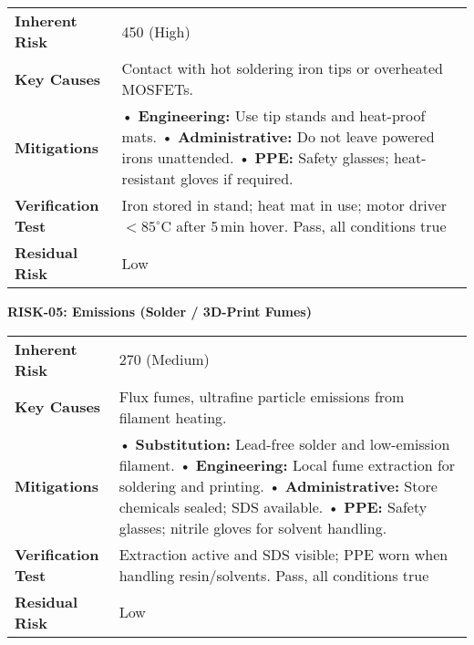 \begin{tabular}{@{}p{3cm}p{13cm}@{}}
\toprule
\textbf{Inherent Risk} & 450 (High) \\
\textbf{Key Causes} & Contact with hot soldering iron tips or overheated MOSFETs. \\
\textbf{Mitigations} &
• \textbf{Engineering:} Use tip stands and heat-proof mats. \newline
• \textbf{Administrative:} Do not leave powered irons unattended. \newline
• \textbf{PPE:} Safety glasses; heat-resistant gloves if required. \\
\textbf{Verification Test} & Iron stored in stand; heat mat in use; motor driver $<85^\circ$C after 5\,min hover. Pass, all conditions true \\
\textbf{Residual Risk} & Low \\
\bottomrule
\end{tabular}
\vspace{0.6em}

\textbf{RISK-05: Emissions (Solder / 3D-Print Fumes)}

\begin{tabular}{@{}p{3cm}p{13cm}@{}}
\toprule
\textbf{Inherent Risk} & 270 (Medium) \\
\textbf{Key Causes} & Flux fumes, ultrafine particle emissions from filament heating. \\
\textbf{Mitigations} &
• \textbf{Substitution:} Lead-free solder and low-emission filament. \newline
• \textbf{Engineering:} Local fume extraction for soldering and printing. \newline
• \textbf{Administrative:} Store chemicals sealed; SDS available. \newline
• \textbf{PPE:} Safety glasses; nitrile gloves for solvent handling. \\
\textbf{Verification Test} & Extraction active and SDS visible; PPE worn when handling resin/solvents. Pass, all conditions true \\
\textbf{Residual Risk} & Low \\
\bottomrule
\end{tabular}
